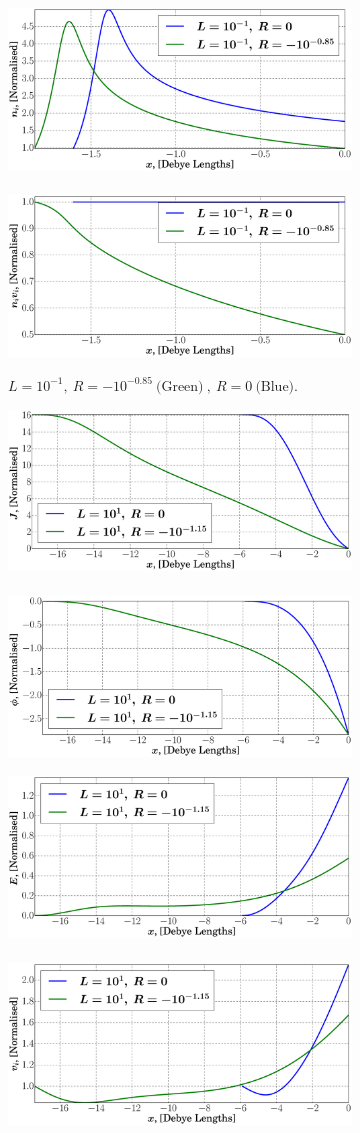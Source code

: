 \documentclass[aip,apl,reprint]{revtex4-1}
\begin{document}
\begin{figure}
\begin{subfigure}[c]{\linewidth}
			\includegraphics[width=0.44\linewidth]{4_-1l.eps}
			~
			\includegraphics[width=0.44\linewidth]{6_-1l.eps}
			\vspace{-0.3cm}
			\caption{$ L = 10^{-1},~ R = -10^{-0.85}~\textrm{(Green)}~,~ R = 0~\textrm{(Blue)} $.}
			\label{sf:rslta}
		\end{subfigure}		
		\begin{subfigure}[c]{\linewidth}
			\centering
			\includegraphics[width=0.44\linewidth]{0_1l.eps}
			~
			\includegraphics[width=0.44\linewidth]{1_1l.eps}
			
			\includegraphics[width=0.44\linewidth]{2_1l.eps}
			~
			\includegraphics[width=0.44\linewidth]{3_1l.eps}
			

\end{subfigure}
\end{figure}
\end{document}
